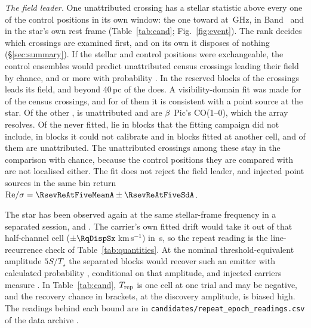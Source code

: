 \label{sec:vistest}%
\emph{The field leader.} One unattributed crossing has a stellar statistic
above every one of the \NCtrl{} control positions in its own window: the one toward
\EvAStar{} at \RqFreqSx\,GHz, in Band~\EvABand{} and in the star's own rest
frame (Table~\ref{tab:cand}; Fig.~\ref{fig:event}). The rank decides which
crossings are examined first, and on its own it disposes of nothing
(\S\ref{sec:summary}). If the stellar and control positions were
exchangeable, the control ensembles would predict \RkCondExp{} unattributed
census crossings leading their field by chance, and \RkCondNObsWord{} or more
with probability \RkCondProb. In the reserved blocks \RkHoLeadWord{} of the \RkHoNWord{}
crossings leads its field, and beyond 40\,pc \RkOosLeadWord{} of the \RkOosNWord{} does. A
visibility-domain fit was made for \CsNVisFit{} of the \CsNCross{} census
crossings, and for \CsNVisLocal{} of them it is consistent with a point source
at the star. Of the other \JqNNotLoc, \JqNNotLocUnWord{} is unattributed and
\JqNNotLocCoWord{} are $\beta$~Pic's CO(1--0), which the array resolves.
Of the \JqNUnfit{} never fitted, \JqNUnfitLateWord{} lie in blocks that the
fitting campaign did not include, \JqNUnfitNocalWord{} in blocks it could not
calibrate and \JqNUnfitOtherWord{} in blocks fitted at another cell, and
\JqNUnfitUn{} of them are unattributed. The unattributed crossings among
these stay in the comparison with chance, because the control positions
they are compared with are not localised either. The fit
does not reject the field leader, and injected point sources in
the same bin return ${\rm Re}/\sigma=\RsevReAtFiveMeanA\pm\RsevReAtFiveSdA$.

The star has been observed again at the same stellar-frame frequency in a
separated session, and \RcSxSepClause. The carrier's own fitted drift would
take it out of that half-channel cell ($\pm\RqDispSx$\,km\,s$^{-1}$) in
\ZtSxLeaveSec\,s, so the repeat reading is the line-recurrence check of
Table~\ref{tab:quantities}. At the nominal threshold-equivalent amplitude
$5S/T_\star$ the separated blocks would recover such an emitter with
calculated probability \RcSxPowerTrig, conditional on that amplitude, and
injected carriers measure \HjMeasSx. In Table~\ref{tab:cand}, $T_{\rm rep}$ is one cell
at one trial and may be negative, and the recovery chance in brackets, at the
discovery amplitude, is biased high. The readings behind each bound are in
\texttt{candidates/repeat\_epoch\_readings.csv} of the data archive
\citep{SIdeposit}.

